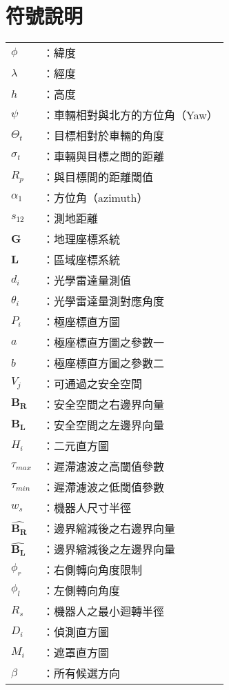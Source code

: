 \chapter*{符號說明}
\begin{longtabu} to \linewidth {X[1,c]X[4,l]}
	$\phi$			&：緯度 \\
	$\lambda$		&：經度 \\
	$h$			&：高度 \\
	$\psi$			&：車輛相對與北方的方位角（Yaw）\\
	$\Theta_t$		&：目標相對於車輛的角度 \\
	$\sigma_t$		&：車輛與目標之間的距離 \\
	$R_p$			&：與目標間的距離閾值 \\
	$\alpha_1$		&：方位角（azimuth） \\
	$s_{12}$		&：測地距離 \\
	$\mathbf{G}$		&：地理座標系統 \\
	$\mathbf{L}$		&：區域座標系統	\\
	$d_i$			&：光學雷達量測值 \\
	$\theta_i$		&：光學雷達量測對應角度	\\
	$P_i$			&：極座標直方圖	\\
	$a$			&：極座標直方圖之參數一	\\
	$b$			&：極座標直方圖之參數二	\\
	$V_j$			&：可通過之安全空間 \\
	$\mathbf{B_R}$		&：安全空間之右邊界向量	\\
	$\mathbf{B_L}$		&：安全空間之左邊界向量 \\
	$H_i$			&：二元直方圖 \\
	$\tau_{max}$		&：遲滯濾波之高閾值參數	\\
	$\tau_{min}$		&：遲滯濾波之低閾值參數 \\
	$w_s$			&：機器人尺寸半徑 \\ 
	$\hat{\mathbf{B_R}}$	&：邊界縮減後之右邊界向量 \\
        $\hat{\mathbf{B_L}}$	&：邊界縮減後之左邊界向量 \\
        $\phi_r$		&：右側轉向角度限制 \\
        $\phi_l$		&：左側轉向角度 \\ 
        $R_s$			&：機器人之最小迴轉半徑 \\
        $D_i$			&：偵測直方圖 \\
        $M_i$			&：遮罩直方圖 \\
        $\beta$			&：所有候選方向 \\

\end{longtabu}
